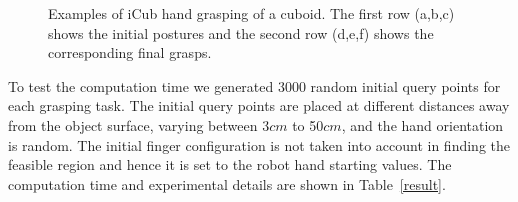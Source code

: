 \begin{figure}

  \caption{\scriptsize{Examples of iCub hand grasping of a cuboid. The first row (a,b,c) shows the initial postures and the second row (d,e,f) shows the corresponding final grasps.}
}
    \label{icub_cuboid}
\end{figure}

To test the computation time we generated 3000 random initial query points for each grasping task. The initial query points are placed at different distances away from the object surface, varying between 3$cm$ to 50$cm$, and the hand orientation is random. The initial finger configuration is not taken into account in finding the feasible region and hence it is set to the robot hand starting values. The computation time and experimental details are shown in Table~\ref{result}.

